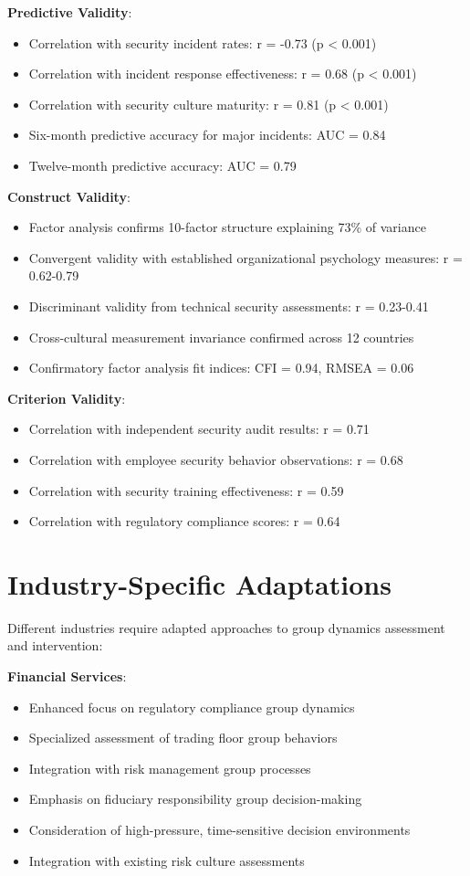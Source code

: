 \documentclass[11pt,a4paper]{article}
\begin{document}
\textbf{Predictive Validity}:
\begin{itemize}
\item Correlation with security incident rates: r = -0.73 (p < 0.001)
\item Correlation with incident response effectiveness: r = 0.68 (p < 0.001)
\item Correlation with security culture maturity: r = 0.81 (p < 0.001)
\item Six-month predictive accuracy for major incidents: AUC = 0.84
\item Twelve-month predictive accuracy: AUC = 0.79
\end{itemize}

\textbf{Construct Validity}:
\begin{itemize}
\item Factor analysis confirms 10-factor structure explaining 73\% of variance
\item Convergent validity with established organizational psychology measures: r = 0.62-0.79
\item Discriminant validity from technical security assessments: r = 0.23-0.41
\item Cross-cultural measurement invariance confirmed across 12 countries
\item Confirmatory factor analysis fit indices: CFI = 0.94, RMSEA = 0.06
\end{itemize}

\textbf{Criterion Validity}:
\begin{itemize}
\item Correlation with independent security audit results: r = 0.71
\item Correlation with employee security behavior observations: r = 0.68
\item Correlation with security training effectiveness: r = 0.59
\item Correlation with regulatory compliance scores: r = 0.64
\end{itemize}

\section{Industry-Specific Adaptations}
\label{app:industry_adaptations}

Different industries require adapted approaches to group dynamics assessment and intervention:

\textbf{Financial Services}:
\begin{itemize}
\item Enhanced focus on regulatory compliance group dynamics
\item Specialized assessment of trading floor group behaviors
\item Integration with risk management group processes
\item Emphasis on fiduciary responsibility group decision-making
\item Consideration of high-pressure, time-sensitive decision environments
\item Integration with existing risk culture assessments
\end{itemize}
\end{document}
